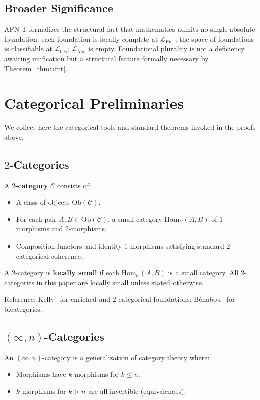 \documentclass[11pt]{article}
\theoremstyle{plain}
\theoremstyle{definition}
\newcommand{\cC}{\mathcal{C}}
\newcommand{\LFnd}{\mathcal{L}_{\mathrm{Fnd}}}
\newcommand{\LCls}{\mathcal{L}_{\mathrm{Cls}}}
\newcommand{\LAbs}{\mathcal{L}_{\mathrm{Abs}}}
\newcommand{\Ob}{\mathrm{Ob}}
\newcommand{\Hom}{\mathrm{Hom}}
\begin{document}
\subsection{Broader Significance}

AFN-T formalizes the structural fact that mathematics admits no single absolute foundation: each foundation is locally complete at $\LFnd$; the space of foundations is classifiable at $\LCls$; $\LAbs$ is empty. Foundational plurality is not a deficiency awaiting unification but a structural feature formally necessary by Theorem~\ref{thm:afnt}.

\appendix

\section{Categorical Preliminaries}\label{app:categorical}

We collect here the categorical tools and standard theorems invoked in the proofs above.

\subsection{\texorpdfstring{$2$-Categories}{2-Categories}}

A \textbf{$2$-category} $\cC$ consists of:
\begin{itemize}
\item A class of objects $\Ob(\cC)$.
\item For each pair $A, B \in \Ob(\cC)$, a small category $\Hom_\cC(A, B)$ of $1$-morphisms and $2$-morphisms.
\item Composition functors and identity $1$-morphisms satisfying standard $2$-categorical coherence.
\end{itemize}

A $2$-category is \textbf{locally small} if each $\Hom_\cC(A, B)$ is a small category. All $2$-categories in this paper are locally small unless stated otherwise.

Reference: Kelly~\cite{Kelly1982} for enriched and $2$-categorical foundations; B\'enabou~\cite{Benabou1967} for bicategories.

\subsection{\texorpdfstring{$(\infty, n)$-Categories}{(infinity,n)-Categories}}

An $(\infty, n)$-category is a generalization of category theory where:
\begin{itemize}
\item Morphisms have $k$-morphisms for $k \leq n$.
\item $k$-morphisms for $k > n$ are all invertible (equivalences).
\end{itemize}
\end{document}
